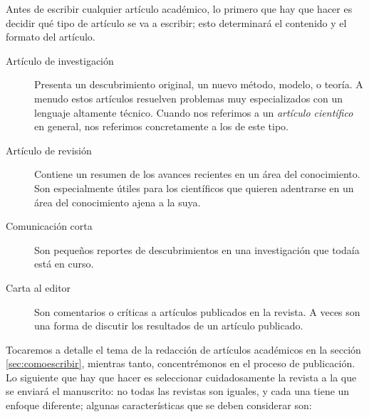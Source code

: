 Antes de escribir cualquier artículo académico, lo primero que hay que hacer es decidir qué tipo de artículo se va a escribir; esto determinará el contenido y el formato del artículo.

\begin{description} \item[Artículo de investigación] Presenta un descubrimiento original, un nuevo método, modelo, o teoría.
	      A menudo estos artículos resuelven problemas muy especializados con un lenguaje altamente técnico.
	      Cuando nos referimos a un \emph{artículo científico} en general, nos referimos concretamente a los de este tipo.
	\item[Artículo de revisión] Contiene un resumen de los avances recientes en un área del conocimiento.
	      Son especialmente útiles para los científicos que quieren adentrarse en un área del conocimiento ajena a la suya.
	\item[Comunicación corta] Son pequeños reportes de descubrimientos en una investigación que todaía está en curso.
	\item[Carta al editor] Son comentarios o críticas a artículos publicados en la revista.
	      A veces son una forma de discutir los resultados de un artículo publicado.
\end{description}

Tocaremos a detalle el tema de la redacción de artículos académicos en la sección \ref{sec:comoescribir}, mientras tanto, concentrémonos en el proceso de publicación.
Lo siguiente que hay que hacer es seleccionar cuidadosamente la revista a la que se enviará el manuscrito: no todas las revistas son iguales, y cada una tiene un enfoque diferente; algunas características que se deben considerar son:

